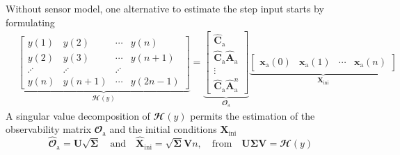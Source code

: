 \documentclass[presentation]{beamer}
\begin{document}
\begin{frame}[label={slide:preliminaries4}]{Without sensor model, one alternative to estimate the step input  starts by formulating}
\small
\begin{equation*} \begin{aligned} & \underbrace{ \begin{bmatrix} y(1) & y(2) & \cdots & y(n) \\ y(2) & y(3) & \cdots & y(n+1) \\ \iddots & \iddots & \iddots \\ y(n) & y(n+1) & \cdots & y(2n-1) \end{bmatrix} }_{ \mathbfcal{H}({y}) } = \underbrace{ \begin{bmatrix} \widehat{\mathbf{C}}_\text{a} \\ \widehat{\mathbf{C}}_\text{a} \widehat{\mathbf{A}}_\text{a} \\ \vdots \\ \widehat{\mathbf{C}}_\text{a} \widehat{\mathbf{A}}_\text{a}^{n} \end{bmatrix} }_{ \mathbfcal{O}_\text{a} }  \underbrace{ \begin{bmatrix} \mathbf{x}_\text{a}(0) & \mathbf{x}_\text{a}(1) & \cdots & \mathbf{x}_\text{a}(n) \end{bmatrix} }_{ \mathbf{X}_\text{ini} } \end{aligned} \end{equation*}
\normalsize
 A singular value decomposition of $\mathbfcal{H}({y})$ permits the estimation of the observability matrix $\mathbfcal{O}_\text{a}$ and the initial conditions $\mathbf{X}_\text{ini}$ \nolinebreak
\begin{equation*}  \widehat{\mathbfcal{O}}_\text{a} = \mathbf{U} \sqrt{\bm{\Sigma}} \quad \mathrm{and} \quad \widehat{\mathbf{X}}_\text{ini} = \sqrt{\bm{\Sigma}} \mathbf{V}n, \quad \mathrm{from} \quad \mathbf{U} \bm{\Sigma} \mathbf{V} = \mathbfcal{H}({y}) \end{equation*}
\end{frame}
\end{document}
